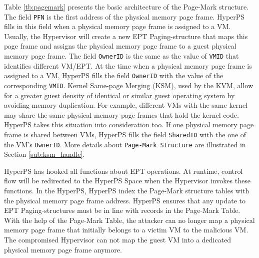 Table \ref{tb:pagemark} presents the basic architecture of the Page-Mark structure.
The field \verb|PFN| is the first address of the physical memory page frame. HyperPS fills in this field when a physical memory page frame is assigned to a VM. Usually, the Hypervisor will create a new EPT Paging-structure that maps this page frame and assigns the physical memory page frame to a guest physical memory page frame. The field \verb|OwnerID| is the same as the value of \verb|VMID| that identifies different VM/EPT. At the time when a physical memory page frame is assigned to a VM, HyperPS fills the field \verb|OwnerID| with the value of the corresponding \verb|VMID|. 
Kernel Same-page Merging (KSM), used by the KVM, allow for a greater guest density of identical or similar guest operating system by avoiding memory duplication.
For example, different VMs with the same kernel may share the same physical memory page frames that hold the kernel code. HyperPS takes this situation into consideration too. If one physical memory page frame is shared between VMs, HyperPS fills the field \verb|SharedID| with the one of the VM's \verb|OwnerID|. More details about \verb|Page-Mark Structure| are illustrated in Section \ref{sub:ksm_handle}.

HyperPS has hooked all functions about EPT operations.
At runtime, control flow will be redirected to the HyperPS Space when the Hypervisor invokes these functions. 
In the HyperPS, HyperPS index the Page-Mark structure tables with the physical memory page frame address. 
HyperPS ensures that any update to EPT Paging-structures must be in line with records in the Page-Mark Table.
With the help of the Page-Mark Table, the attacker can no longer map a physical memory page frame that initially belongs to a victim VM to the malicious VM. The compromised Hypervisor can not map the guest VM into a dedicated physical memory page frame anymore. 

\begin{table}[]
    \caption{Page-Mark Structure}
    \label{tb:pagemark}
\end{table}

